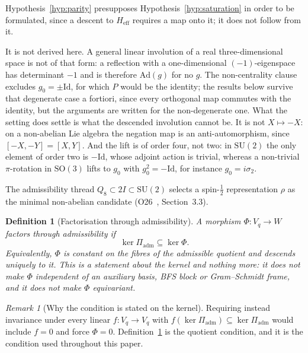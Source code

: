 \documentclass[11pt,a4paper]{article}
\newtheorem{definition}[theorem]{Definition}
\theoremstyle{remark}
\newtheorem{remark}[theorem]{Remark}
\begin{document}
  Hypothesis~\ref{hyp:parity} presupposes Hypothesis~\ref{hyp:saturation} in order to be
  formulated, since a descent to $H_{\mathrm{eff}}$ requires a map onto it; it does not follow from
  it.

  It is not derived here.
  A general linear involution of a real three-dimensional space is not of that form: a reflection
  with a one-dimensional $(-1)$-eigenspace has determinant $-1$ and is therefore $\mathrm{Ad}(g)$
  for no $g$.
  The non-centrality clause excludes $g_0 = \pm\mathrm{Id}$, for which $P$ would be the identity;
  the results below survive that degenerate case a fortiori, since every orthogonal map commutes
  with the identity, but the arguments are written for the non-degenerate one.
  What the setting does settle is what the descended involution cannot be.
  It is not $X \mapsto -X$: on a non-abelian Lie algebra the negation map is an anti-automorphism,
  since $[-X,-Y] = [X,Y]$.
  And the lift is of order four, not two: in $\mathrm{SU}(2)$ the only element of order two is
  $-\mathrm{Id}$, whose adjoint action is trivial, whereas a non-trivial $\pi$-rotation in
  $\mathrm{SO}(3)$ lifts to $g_0$ with $g_0^2 = -\mathrm{Id}$, for instance $g_0 = i\sigma_2$.

  The admissibility thread $Q_8 \subset 2I \subset \mathrm{SU}(2)$ selects a spin-$\tfrac{1}{2}$
  representation $\rho$ as the minimal non-abelian candidate (O26~\cite{Beau2026a30},
  Section~3.3).

  \begin{definition}[Factorisation through admissibility]
    \label{def:naturality}
    A morphism $\Phi \colon V_q \to W$ \emph{factors through admissibility} if
    \[
      \ker \Pi_{\mathrm{adm}} \subseteq \ker \Phi .
    \]
    Equivalently, $\Phi$ is constant on the fibres of the admissible quotient and descends uniquely
    to it.
    This is a statement about the kernel and nothing more: it does not make $\Phi$ independent of an
    auxiliary basis, BFS block or Gram--Schmidt frame, and it does not make $\Phi$ equivariant.
  \end{definition}

  \begin{remark}[Why the condition is stated on the kernel]
    \label{rem:kernel-form}
    Requiring instead invariance under every linear $f \colon V_q \to V_q$ with $f(\ker
    \Pi_{\mathrm{adm}}) \subseteq \ker \Pi_{\mathrm{adm}}$ would include $f = 0$ and force
    $\Phi = 0$.
    Definition~\ref{def:naturality} is the quotient condition, and it is the condition used
    throughout this paper.
  \end{remark}
\end{document}
